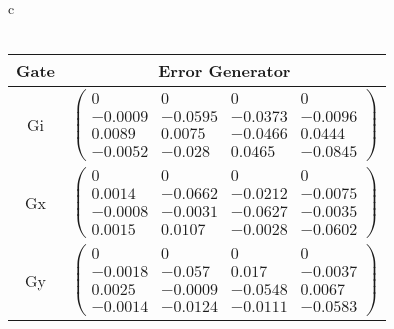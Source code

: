 \documentclass{beamer}
\begin{document}
\begin{frame}
\begin{table}[h]
\begin{center}
{\begin{tabular}{c}
\\
\vspace{2em}
\\
\begin{tabular}[l]{|c|c|}
\hline
Gate & Error Generator \\ \hline
Gi & $ \left(\!\!\begin{array}{cccc}
0 & 0 & 0 & 0 \\ 
-0.0009 & -0.0595 & -0.0373 & -0.0096 \\ 
0.0089 & 0.0075 & -0.0466 & 0.0444 \\ 
-0.0052 & -0.028 & 0.0465 & -0.0845
 \end{array}\!\!\right) $
 \\ \hline
Gx & $ \left(\!\!\begin{array}{cccc}
0 & 0 & 0 & 0 \\ 
0.0014 & -0.0662 & -0.0212 & -0.0075 \\ 
-0.0008 & -0.0031 & -0.0627 & -0.0035 \\ 
0.0015 & 0.0107 & -0.0028 & -0.0602
 \end{array}\!\!\right) $
 \\ \hline
Gy & $ \left(\!\!\begin{array}{cccc}
0 & 0 & 0 & 0 \\ 
-0.0018 & -0.057 & 0.017 & -0.0037 \\ 
0.0025 & -0.0009 & -0.0548 & 0.0067 \\ 
-0.0014 & -0.0124 & -0.0111 & -0.0583
 \end{array}\!\!\right) $
 \\ \hline
\end{tabular}

\end{tabular}
}
\end{center}
\end{table}

\end{frame}
\end{document}
